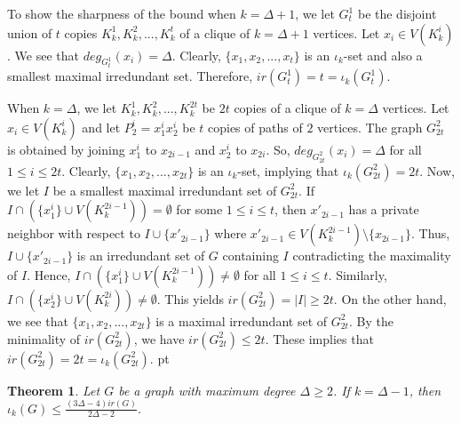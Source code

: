 \documentclass[11pt]{article}
\newtheorem{thm}{Theorem}
\newcommand{\2}{ \vspace{0.2cm} }
\newcommand{\1}{ \vspace{0.1cm} }
\begin{document}
\indent To show the sharpness of the bound when $k = \Delta + 1$, we let $G^{1}_{t}$ be the disjoint union of $t$ copies $K^{1}_{k}, K^{2}_{k}, ..., K^{t}_{k}$ of a clique of $k = \Delta + 1$ vertices. Let $x_{i} \in V(K^{i}_{k})$. We see that $deg_{G^{1}_{t}}(x_{i}) = \Delta$. Clearly, $\{x_{1}, x_{2}, ..., x_{t}\}$ is an $\iota_{k}$-set and also a smallest maximal irredundant set. Therefore, $ir(G^{1}_{t}) = t = \iota_{k}(G^{1}_{t})$.

When $k = \Delta$, we let $K^{1}_{k}, K^{2}_{k}, ..., K^{2t}_{k}$ be $2t$ copies of a clique of $k = \Delta$ vertices. Let $x_{i} \in V(K^{i}_{k})$ and let $P^{i}_{2} = x^{i}_{1}x^{i}_{2}$ be $t$ copies of paths of $2$ vertices. The graph $G^{2}_{2t}$ is obtained by joining $x^{i}_{1}$ to $x_{2i - 1}$ and $x^{i}_{2}$ to $x_{2i}$. So, $deg_{G^{2}_{2t}}(x_{i}) = \Delta$ for all $1 \leq i \leq 2t$. Clearly, $\{x_{1}, x_{2}, ..., x_{2t}\}$ is an $\iota_{k}$-set, implying that $\iota_{k}(G^{2}_{2t}) = 2t$. Now, we let $I$ be a smallest maximal irredundant set of $G^{2}_{2t}$. If $I \cap (\{x^{i}_{1}\} \cup V(K^{2i-1}_{k})) = \emptyset$ for some $1 \leq i \leq t$, then $x'_{2i - 1}$ has a private neighbor with respect to $I \cup \{x'_{2i - 1}\}$ where $x'_{2i - 1} \in V(K^{2i-1}_{k}) \setminus \{x_{2i - 1}\}$. Thus, $I \cup \{x'_{2i - 1}\}$ is an irredundant set of $G$ containing $I$ contradicting the maximality of $I$. Hence, $I \cap (\{x^{i}_{1}\} \cup V(K^{2i-1}_{k})) \neq \emptyset$ for all $1 \leq i \leq t$. Similarly, $I \cap (\{x^{i}_{2}\} \cup V(K^{2i}_{k})) \neq \emptyset$. This yields $ir(G^{2}_{2t}) = |I| \geq 2t$. On the other hand, we see that $\{x_{1}, x_{2}, ..., x_{2t}\}$ is a maximal irredundant set of $G^{2}_{2t}$. By the minimality of $ir(G^{2}_{2t})$, we have $ir(G^{2}_{2t}) \leq 2t$. These implies that $ir(G^{2}_{2t}) = 2t = \iota_{k}(G^{2}_{2t})$.
 pt



\begin{thm}\label{thm 2}
Let $G$ be a graph with maximum degree $\Delta \ge 2$. If $k = \Delta - 1$, then $\iota_{k}(G) \leq \frac{(3\Delta - 4)ir(G)}{2\Delta - 2}$.
\end{thm}
\end{document}

